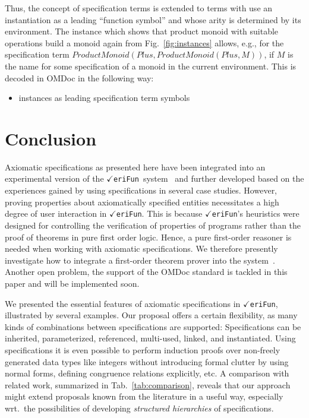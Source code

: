 \documentclass{article}
\theoremstyle{remark}
\theoremstyle{definition}
\newcommand{\VeriFun}{\mbox{{\Large $\checkmark $}\hspace{-0.21cm}\texttt{eriFun}}}
\newcommand{\name}[1]{\mathit{#1}}
\begin{document}
Thus, the concept of specification terms is extended to terms with use an instantiation as a leading ``function
symbol'' and whose arity is determined by its environment. The instance which shows that product monoid with suitable
operations build a monoid again from Fig.~\ref{fig:instances} allows, e.g., for the specification term
$\name{ProductMonoid}(\name{Plus},\name{ProductMonoid}(\name{Plus},M))$, if $M$ is the name for some specification of a
monoid in the current environment. This is decoded in OMDoc in the following way:
\begin{itemize}
  \item instances as leading specification term symbols
\end{itemize}

\section{Conclusion} \label{sec:conclusion}

Axiomatic specifications as presented here have been integrated into an experimental version of the \VeriFun\
system~\cite{K:Module} and further developed based on the experiences gained by using specifications in several case
studies. However, proving properties about axiomatically specified entities necessitates a high degree of user
interaction in \VeriFun. This is because \VeriFun's heuristics were designed for controlling the verification of
properties of programs rather than the proof of theorems in pure first order logic. Hence, a pure first-order reasoner
is needed when working with axiomatic specifications. We therefore presently investigate how to integrate a first-order
theorem prover into the system~\cite{E:FOI}. Another open problem, the support of the OMDoc standard is tackled in this
paper and will be implemented soon.

We presented the essential features of axiomatic specifications in \VeriFun, illustrated by several examples. Our
proposal offers a certain flexibility, as many kinds of combinations between specifications are supported:
Specifications can be inherited, parameterized, referenced, multi-used, linked, and instantiated. Using specifications
it is even possible to perform induction proofs over non-freely generated data types like integers without introducing
formal clutter by using normal forms, defining congruence relations explicitly, etc. A comparison with related work,
summarized in Tab.~\ref{tab:comparison}, reveals that our approach might extend proposals known from the literature in
a useful way, especially wrt.\ the possibilities of developing \emph{structured hierarchies} of specifications.
\end{document}
